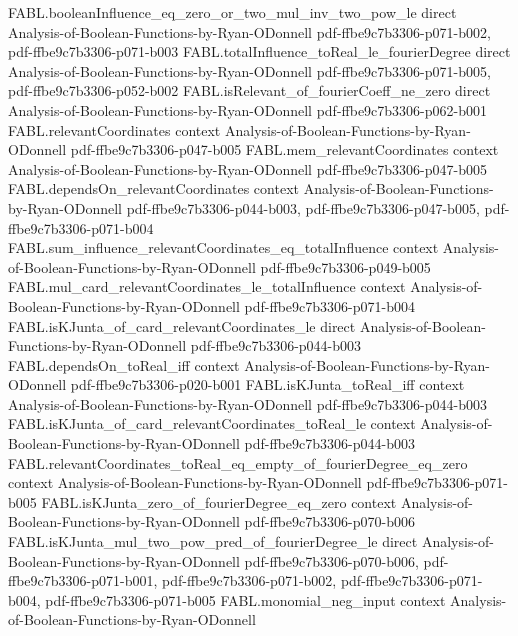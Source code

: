 \begin{theorem}
\proofstep
  {FABL.booleanInfluence_eq_zero_or_two_mul_inv_two_pow_le}
  {direct}
  {Analysis-of-Boolean-Functions-by-Ryan-ODonnell}
  {pdf-ffbe9c7b3306-p071-b002,
    pdf-ffbe9c7b3306-p071-b003}
\proofstep
  {FABL.totalInfluence_toReal_le_fourierDegree}
  {direct}
  {Analysis-of-Boolean-Functions-by-Ryan-ODonnell}
  {pdf-ffbe9c7b3306-p071-b005,
    pdf-ffbe9c7b3306-p052-b002}
\proofstep
  {FABL.isRelevant_of_fourierCoeff_ne_zero}
  {direct}
  {Analysis-of-Boolean-Functions-by-Ryan-ODonnell}
  {pdf-ffbe9c7b3306-p062-b001}
\proofstep
  {FABL.relevantCoordinates}
  {context}
  {Analysis-of-Boolean-Functions-by-Ryan-ODonnell}
  {pdf-ffbe9c7b3306-p047-b005}
\proofstep
  {FABL.mem_relevantCoordinates}
  {context}
  {Analysis-of-Boolean-Functions-by-Ryan-ODonnell}
  {pdf-ffbe9c7b3306-p047-b005}
\proofstep
  {FABL.dependsOn_relevantCoordinates}
  {context}
  {Analysis-of-Boolean-Functions-by-Ryan-ODonnell}
  {pdf-ffbe9c7b3306-p044-b003,
    pdf-ffbe9c7b3306-p047-b005,
    pdf-ffbe9c7b3306-p071-b004}
\proofstep
  {FABL.sum_influence_relevantCoordinates_eq_totalInfluence}
  {context}
  {Analysis-of-Boolean-Functions-by-Ryan-ODonnell}
  {pdf-ffbe9c7b3306-p049-b005}
\proofstep
  {FABL.mul_card_relevantCoordinates_le_totalInfluence}
  {context}
  {Analysis-of-Boolean-Functions-by-Ryan-ODonnell}
  {pdf-ffbe9c7b3306-p071-b004}
\proofstep
  {FABL.isKJunta_of_card_relevantCoordinates_le}
  {direct}
  {Analysis-of-Boolean-Functions-by-Ryan-ODonnell}
  {pdf-ffbe9c7b3306-p044-b003}
\proofstep
  {FABL.dependsOn_toReal_iff}
  {context}
  {Analysis-of-Boolean-Functions-by-Ryan-ODonnell}
  {pdf-ffbe9c7b3306-p020-b001}
\proofstep
  {FABL.isKJunta_toReal_iff}
  {context}
  {Analysis-of-Boolean-Functions-by-Ryan-ODonnell}
  {pdf-ffbe9c7b3306-p044-b003}
\proofstep
  {FABL.isKJunta_of_card_relevantCoordinates_toReal_le}
  {context}
  {Analysis-of-Boolean-Functions-by-Ryan-ODonnell}
  {pdf-ffbe9c7b3306-p044-b003}
\proofstep
  {FABL.relevantCoordinates_toReal_eq_empty_of_fourierDegree_eq_zero}
  {context}
  {Analysis-of-Boolean-Functions-by-Ryan-ODonnell}
  {pdf-ffbe9c7b3306-p071-b005}
\proofstep
  {FABL.isKJunta_zero_of_fourierDegree_eq_zero}
  {context}
  {Analysis-of-Boolean-Functions-by-Ryan-ODonnell}
  {pdf-ffbe9c7b3306-p070-b006}
\proofstep
  {FABL.isKJunta_mul_two_pow_pred_of_fourierDegree_le}
  {direct}
  {Analysis-of-Boolean-Functions-by-Ryan-ODonnell}
  {pdf-ffbe9c7b3306-p070-b006,
    pdf-ffbe9c7b3306-p071-b001,
    pdf-ffbe9c7b3306-p071-b002,
    pdf-ffbe9c7b3306-p071-b004,
    pdf-ffbe9c7b3306-p071-b005}
\proofstep
  {FABL.monomial_neg_input}
  {context}
  {Analysis-of-Boolean-Functions-by-Ryan-ODonnell}

\end{theorem}
